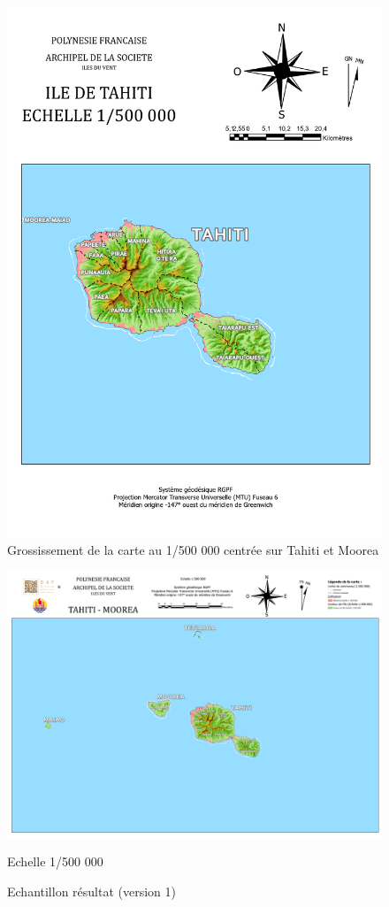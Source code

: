 \documentclass{themeensg}
\begin{document}
\begin{appendices}
\begin{figure}[!h]
\centering
\includegraphics[width=\linewidth]{images/Annexes/Resultat/Carte_500000_A4.pdf}
\caption{Grossissement de la carte au 1/500 000 centrée sur Tahiti et Moorea}
\label{500000_gros}
\end{figure}

\begin{figure}
\centering
\includegraphics[width=\linewidth]{images/Annexes/Resultat/Carte_500000_v1.pdf}%
\caption{Echantillon résultat (version 1) }
\colorbox{black!10}{Echelle 1/500 000}
\label{500000 v2}%
\end{figure}


\end{appendices}
\end{document}
